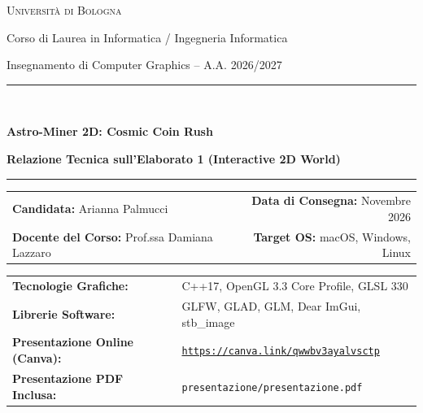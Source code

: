 \documentclass[11pt,a4paper]{article}
\begin{document}
\begin{center}
    {\scshape\Large Università di Bologna \par}
    \vspace{0.2cm}
    {\large Corso di Laurea in Informatica / Ingegneria Informatica\par}
    {\large Insegnamento di Computer Graphics -- A.A. 2026/2027\par}
    \vspace{0.6cm}
    \rule{\linewidth}{1.2pt}\\[0.3cm]
    {\huge\bfseries\color{primaryBlue} Astro-Miner 2D: Cosmic Coin Rush\par}
    \vspace{0.2cm}
    {\Large\bfseries\color{accentTeal} Relazione Tecnica sull'Elaborato 1 (Interactive 2D World)\par}
    \rule{\linewidth}{1.2pt}
    \vspace{0.4cm}

    \vspace{0.3cm}
    \begin{tabularx}{\linewidth}{@{}X r@{}}
        \textbf{Candidata:} Arianna Palmucci & \textbf{Data di Consegna:} Novembre 2026 \\
        \textbf{Docente del Corso:} Prof.ssa Damiana Lazzaro & \textbf{Target OS:} macOS, Windows, Linux \\
    \end{tabularx}
    \vspace{0.15cm}
    \small
    \begin{tabularx}{\linewidth}{@{}l X@{}}
        \textbf{Tecnologie Grafiche:} & C++17, OpenGL 3.3 Core Profile, GLSL 330 \\
        \textbf{Librerie Software:} & GLFW, GLAD, GLM, Dear ImGui, stb\_image \\
        \textbf{Presentazione Online (Canva):} & \href{https://canva.link/qwwbv3ayalvsctp}{\texttt{https://canva.link/qwwbv3ayalvsctp}} \\
        \textbf{Presentazione PDF Inclusa:} & \texttt{presentazione/presentazione.pdf} \\
    \end{tabularx}
\end{center}

\vspace{0.2cm}
\end{document}
